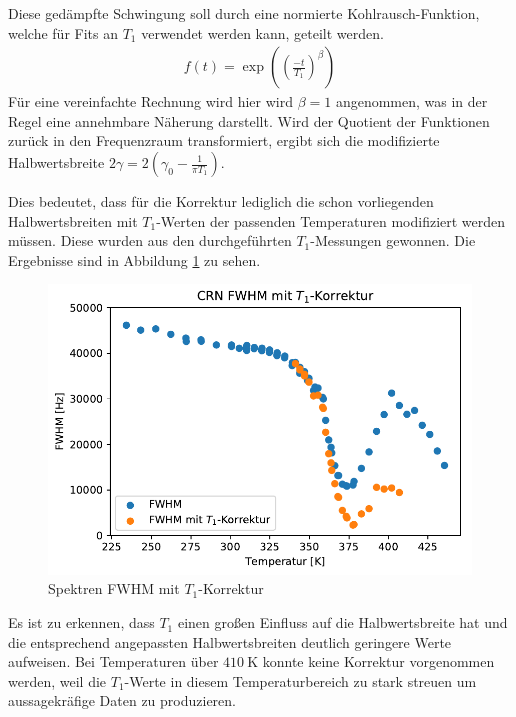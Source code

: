 Diese gedämpfte Schwingung soll durch eine normierte Kohlrausch-Funktion, welche für Fits an $T_1$ verwendet werden kann, geteilt werden.
\begin{align}
	f(t) = \exp{\left( {\left(\frac{-t}{T_1} \right)}^\beta \right) }
\end{align}
Für eine vereinfachte Rechnung wird hier wird $\beta = 1$ angenommen, was in der Regel eine annehmbare Näherung darstellt. Wird der Quotient der Funktionen zurück in den Frequenzraum transformiert, ergibt sich die modifizierte Halbwertsbreite $2\gamma = 2(\gamma_0 - \frac{1}{\pi T_1})$.

Dies bedeutet, dass für die Korrektur lediglich die schon vorliegenden Halbwertsbreiten mit $T_1$-Werten der passenden Temperaturen modifiziert werden müssen. Diese wurden aus den durchgeführten $T_1$-Messungen gewonnen. Die Ergebnisse sind in Abbildung \ref{fig:res:spek_fwhm_t1} zu sehen.
\begin{figure}
	\begin{center}
		\includegraphics[width=\textwidth]{graphics/plots/SPEK/spek_t1korr.pdf}
	\end{center}
	\caption{Spektren FWHM mit $T_1$-Korrektur} \label{fig:res:spek_fwhm_t1}
\end{figure}

Es ist zu erkennen, dass $T_1$ einen großen Einfluss auf die Halbwertsbreite hat und die entsprechend angepassten Halbwertsbreiten deutlich geringere Werte aufweisen. Bei Temperaturen über $\SI{410}{\kelvin}$ konnte keine Korrektur vorgenommen werden, weil die $T_1$-Werte in diesem Temperaturbereich zu stark streuen um aussagekräfige Daten zu produzieren.




